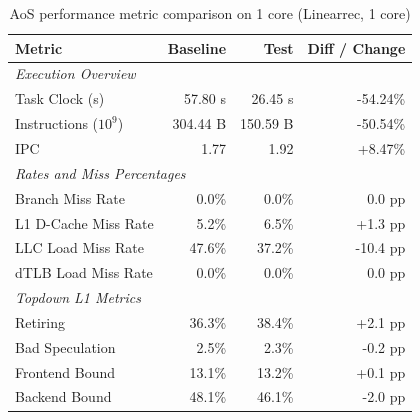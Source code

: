         \begin{table}[htbp]
      \centering
      \caption{AoS performance metric comparison on 1 core (Linearrec, 1 core)}
      \label{tab:perf_comparison_aos_linearrec_1core}
      \begin{tabular}{lrrr}
        \toprule
        \textbf{Metric} & \textbf{Baseline} & \textbf{Test} & \textbf{Diff / Change} \\
        \midrule
        \multicolumn{4}{l}{\textit{Execution Overview}} \\
        \quad Task Clock (s)           & 57.80 s   & 26.45 s   & -54.24\%   \\
        \quad Instructions ($10^9$)    & 304.44 B  & 150.59 B  & -50.54\%   \\
        \quad IPC                      & 1.77       & 1.92       & +8.47\%    \\
        \midrule
        \multicolumn{4}{l}{\textit{Rates and Miss Percentages}} \\
        \quad Branch Miss Rate         & 0.0\%      & 0.0\%      & 0.0 pp     \\
        \quad L1 D-Cache Miss Rate     & 5.2\%      & 6.5\%      & +1.3 pp    \\
        \quad LLC Load Miss Rate       & 47.6\%     & 37.2\%     & -10.4 pp    \\
        \quad dTLB Load Miss Rate      & 0.0\%      & 0.0\%      & 0.0 pp     \\
        \midrule
        \multicolumn{4}{l}{\textit{Topdown L1 Metrics}} \\
        \quad Retiring                 & 36.3\%     & 38.4\%     & +2.1 pp   \\
        \quad Bad Speculation          & 2.5\%     & 2.3\%     & -0.2 pp   \\
        \quad Frontend Bound           & 13.1\%     & 13.2\%     & +0.1 pp   \\
        \quad Backend Bound            & 48.1\%     & 46.1\%     & -2.0 pp   \\
        \bottomrule
      \end{tabular}
    \end{table}

